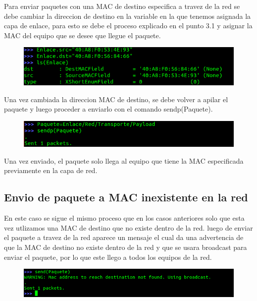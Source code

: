 \documentclass[spanish]{udpreport}
\begin{document}
Para enviar paquetes con una MAC de destino especifica a travez de la red se debe cambiar la direccion de destino en la variable en la que tenemos asignada la capa de enlace, para esto se debe el proceso explicado en el punto 3.1 y asignar la MAC del equipo que se desee que llegue el paquete.\\
\begin{figure}[H]
\begin{center}
\includegraphics[scale=0.7]{images/switch3.png}
\end{center}
\end{figure}
\vspace{14cm}
Una vez cambiada la direccion MAC de destino, se debe volver a apilar el paquete y luego proceder a enviarlo con el comando sendp(Paquete).\\
\begin{figure}[H]
\begin{center}
\includegraphics[scale=0.7]{images/switch4.png}
\end{center}
\end{figure}
Una vez enviado, el paquete solo llega al equipo que tiene la MAC especificada previamente en la capa de red.

\subsection{Envio de paquete a MAC inexistente en la red}

En este caso se sigue el mismo proceso que en los casos anteriores solo que esta vez utlizamos una MAC de destino que no existe dentro de la red. luego de enviar el paquete a travez de la red aparece un mensaje el cual da una advertencia de que la MAC de destino no existe dentro de la red y que se usara broadcast para enviar el paquete, por lo que este llego a todos los equipos de la red.
\begin{figure}[H]
\begin{center}
\includegraphics[scale=0.7]{images/switch5.png}
\end{center}
\end{figure}
\end{document}
